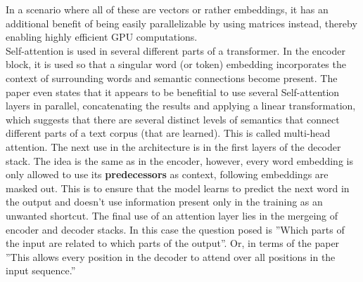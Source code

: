 \documentclass[draft,final]{vutinfth} %
\begin{document}
In a scenario where all of these are vectors or rather embeddings, it has an additional benefit of being easily parallelizable by using matrices instead, thereby enabling highly efficient GPU computations.\\
Self-attention is used in several different parts of a transformer. In the encoder block, it is used so that a singular word (or token) embedding incorporates the context of surrounding words and semantic connections become present. The paper even states that it appears to be benefitial to use several Self-attention layers in parallel, concatenating the results and applying a linear transformation, which suggests that there are several distinct levels of semantics that connect different parts of a text corpus (that are learned). This is called multi-head attention. The next use in the architecture is in the first layers of the decoder stack. The idea is the same as in the encoder, however, every word embedding is only allowed to use its \textbf{predecessors} as context, following embeddings are masked out. This is to ensure that the model learns to predict the next word in the output and doesn't use information present only in the training as an unwanted shortcut. The final use of an attention layer lies in the mergeing of encoder and decoder stacks. In this case  the question posed is ''Which parts of the input are related to which parts of the output''. Or, in terms of the paper ''This allows every position in the decoder to attend over all positions in the input sequence.'' \cite[p. 5]{vaswani_attention_2017}
\end{document}
